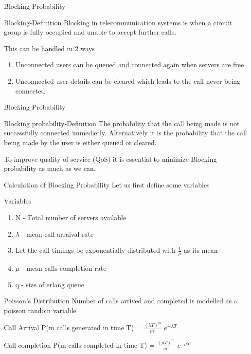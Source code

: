 \documentclass{beamer}
\begin{document}
\begin{frame}{Blocking Probability}
  \begin{block}{Blocking-Definition}
    Blocking in telecommunication systems is when a circuit group is fully occupied and unable to accept further calls.
  \end{block}
  This can be handled in 2 ways
  \begin{block}{}
    \begin{enumerate}
      \item Unconnected users can be queued and connected again when servers are free
      \item Unconnected user details can be cleared which leads to the call never being connected
    \end{enumerate}
  \end{block}
\end{frame}
\begin{frame}{Blocking Probability}
  \begin{block}{Blocking probability-Definition}
    The probability that the call being made is not successfully connected immedietly. Alternatively it is
    the probability that the call being made by the user is either queued or cleared.
  \end{block}
  To improve quality of service (QoS) it is essential to minimize Blocking probability as much as we can.
\end{frame}
\begin{frame}{Calculation of Blocking Probability}
  Let us first define some variables
  \begin{block}{Variables}
    \begin{enumerate}
      \item N - Total number of servers available
      \item $\lambda$ - mean call arraival rate
      \item Let the call timings be exponentially distributed with $\frac{1}{\mu}$ as its mean
      \item $\mu$ - mean calls completion rate
      \item q - size of erlang queue
    \end{enumerate}
  \end{block}
\end{frame}
\begin{frame}{Poisson's Distribution}
  Number of calls arrived and completed is modelled as a poisson random variable
  \begin{block}{Call Arrival}
    P(m calls generated in time T) = $\frac{{(\lambda T)^m}}{m!}$ $e^{-\lambda T}$
  \end{block}
  \begin{block}{Call completion}
    P(m calls completed in time T) = $\frac{{(\mu T)^m}}{m!}$ $e^{-\mu T}$
  \end{block}
\end{frame}
\end{document}
